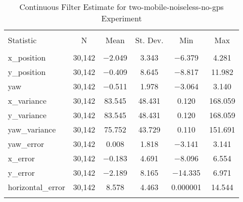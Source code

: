 
\begin{table}[h] \centering 
  \caption{Continuous Filter Estimate for two-mobile-noiseless-no-gps Experiment} 
  \label{tab:two_mobile_noiseless_no_gps_continuous_summary} 
\begin{tabular}{@{\extracolsep{5pt}}lccccc} 
\\[-1.8ex]\hline 
\hline \\[-1.8ex] 
Statistic & \multicolumn{1}{c}{N} & \multicolumn{1}{c}{Mean} & \multicolumn{1}{c}{St. Dev.} & \multicolumn{1}{c}{Min} & \multicolumn{1}{c}{Max} \\ 
\hline \\[-1.8ex] 
x\_position & 30,142 & $-$2.049 & 3.343 & $-$6.379 & 4.281 \\ 
y\_position & 30,142 & $-$0.409 & 8.645 & $-$8.817 & 11.982 \\ 
yaw & 30,142 & $-$0.511 & 1.978 & $-$3.064 & 3.140 \\ 
x\_variance & 30,142 & 83.545 & 48.431 & 0.120 & 168.059 \\ 
y\_variance & 30,142 & 83.545 & 48.431 & 0.120 & 168.059 \\ 
yaw\_variance & 30,142 & 75.752 & 43.729 & 0.110 & 151.691 \\ 
yaw\_error & 30,142 & 0.008 & 1.818 & $-$3.141 & 3.141 \\ 
x\_error & 30,142 & $-$0.183 & 4.691 & $-$8.096 & 6.554 \\ 
y\_error & 30,142 & $-$2.189 & 8.165 & $-$14.335 & 6.971 \\ 
horizontal\_error & 30,142 & 8.578 & 4.463 & 0.000001 & 14.544 \\ 
\hline \\[-1.8ex] 
\end{tabular} 
\end{table} 
